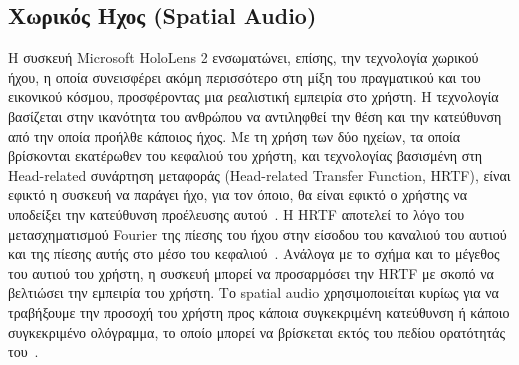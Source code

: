 \subsection{Χωρικός Ήχος (Spatial Audio)}\label{subsec:hololensSpatialAudio}
Η συσκευή Microsoft HoloLens 2 ενσωματώνει, επίσης, την τεχνολογία χωρικού ήχου, η οποία συνεισφέρει ακόμη περισσότερο στη μίξη του πραγματικού και του εικονικού κόσμου, προσφέροντας μια ρεαλιστική εμπειρία στο χρήστη. Η τεχνολογία βασίζεται στην ικανότητα του ανθρώπου να αντιληφθεί την θέση και την κατεύθυνση από την οποία προήλθε κάποιος ήχος. Με τη χρήση των δύο ηχείων, τα οποία βρίσκονται εκατέρωθεν του κεφαλιού του χρήστη, και τεχνολογίας βασισμένη στη Head-related συνάρτηση μεταφοράς (Head-related Transfer Function, HRTF), είναι εφικτό η συσκευή να παράγει ήχο, για τον όποιο, θα είναι εφικτό ο χρήστης να υποδείξει την κατεύθυνση προέλευσης αυτού~\cite{kegodin_2022_spatial}. Η HRTF αποτελεί το λόγο του μετασχηματισμού Fourier της πίεσης του ήχου στην είσοδου του καναλιού του αυτιού και της πίεσης αυτής στο μέσο του κεφαλιού~\cite{henrikmller_1992_fundamentals}. Ανάλογα με το σχήμα και το μέγεθος του αυτιού του χρήστη, η συσκευή μπορεί να προσαρμόσει την HRTF με σκοπό να βελτιώσει την εμπειρία του χρήστη. Το spatial audio χρησιμοποιείται κυρίως για να τραβήξουμε την προσοχή του χρήστη προς κάποια συγκεκριμένη κατεύθυνση ή κάποιο συγκεκριμένο ολόγραμμα, το οποίο μπορεί να βρίσκεται εκτός του πεδίου ορατότητάς του~\cite{kegodin_2022_spatial}.